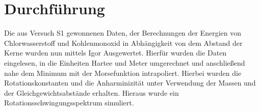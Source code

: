 
 
%
\section{Durchführung}
Die aus Versuch S1 gewonnenen Daten, der Berechnungen der Energien von Chlorwasserstoff und Kohlenmonoxid in Abhängigkeit von dem Abstand der Kerne wurden nun mittels Igor Ausgewertet. Hierfür wurden die Daten eingelesen, in die Einheiten Hartee und Meter umgerechnet und anschließend nahe dem Minimum mit der Morsefunktion intrapoliert. Hierbei wurden die Rotationskonstanten und die Anharminizität unter Verwendung der Massen und der Gleichgewichtsabstände erhalten. Hieraus wurde ein Rotationsschwingungsspektrum simuliert.
%